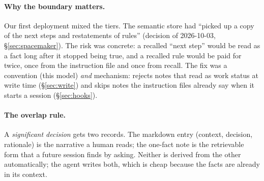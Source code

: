 \paragraph{Why the boundary matters.} Our first deployment mixed the tiers. The semantic store had ``picked up a copy of the next steps and restatements of rules'' (decision of 2026-10-03, \S\ref{sec:spacemaker}). The risk was concrete: a recalled ``next step'' would be read as a fact long after it stopped being true, and a recalled rule would be paid for twice, once from the instruction file and once from recall. The fix was a convention (this model) \emph{and} mechanism: \jevmem{} rejects notes that read as work status at write time (\S\ref{sec:write}) and skips notes the instruction files already say when it starts a session (\S\ref{sec:hooks}).

\paragraph{The overlap rule.} A \emph{significant decision} gets two records. The markdown entry (context, decision, rationale) is the narrative a human reads; the one-fact note is the retrievable form that a future session finds by asking. Neither is derived from the other automatically; the agent writes both, which is cheap because the facts are already in its context.
